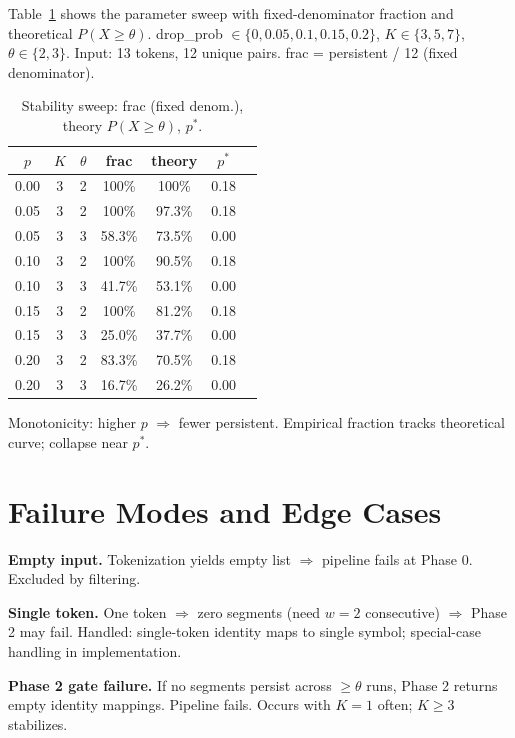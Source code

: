 Table~\ref{tab:stability_full} shows the parameter sweep with fixed-denominator fraction and theoretical $P(X \geq \theta)$. drop\_prob $\in \{0, 0.05, 0.1, 0.15, 0.2\}$, $K \in \{3, 5, 7\}$, $\theta \in \{2, 3\}$. Input: 13 tokens, 12 unique pairs. frac = persistent / 12 (fixed denominator).

\begin{table}[t]
\centering
\caption{Stability sweep: frac (fixed denom.), theory $P(X \geq \theta)$, $p^*$.}
\label{tab:stability_full}
\small
\begin{tabular}{ccccccc}
\toprule
\textbf{$p$} & \textbf{$K$} & \textbf{$\theta$} & \textbf{frac} & \textbf{theory} & \textbf{$p^*$} \\
\midrule
0.00 & 3 & 2 & 100\% & 100\% & 0.18 \\
0.05 & 3 & 2 & 100\% & 97.3\% & 0.18 \\
0.05 & 3 & 3 & 58.3\% & 73.5\% & 0.00 \\
0.10 & 3 & 2 & 100\% & 90.5\% & 0.18 \\
0.10 & 3 & 3 & 41.7\% & 53.1\% & 0.00 \\
0.15 & 3 & 2 & 100\% & 81.2\% & 0.18 \\
0.15 & 3 & 3 & 25.0\% & 37.7\% & 0.00 \\
0.20 & 3 & 2 & 83.3\% & 70.5\% & 0.18 \\
0.20 & 3 & 3 & 16.7\% & 26.2\% & 0.00 \\
\bottomrule
\end{tabular}
\end{table}

Monotonicity: higher $p$ $\Rightarrow$ fewer persistent. Empirical fraction tracks theoretical curve; collapse near $p^*$.

\section{Failure Modes and Edge Cases}
\label{app:failures}

\textbf{Empty input.}
Tokenization yields empty list $\Rightarrow$ pipeline fails at Phase 0. Excluded by filtering.

\textbf{Single token.}
One token $\Rightarrow$ zero segments (need $w=2$ consecutive) $\Rightarrow$ Phase 2 may fail. Handled: single-token identity maps to single symbol; special-case handling in implementation.

\textbf{Phase 2 gate failure.}
If no segments persist across $\geq \theta$ runs, Phase 2 returns empty identity mappings. Pipeline fails. Occurs with $K=1$ often; $K \geq 3$ stabilizes.

